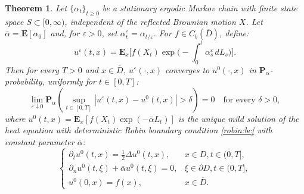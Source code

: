 \documentclass[11pt]{amsart}
\theoremstyle{plain}
\newtheorem{theorem}{Theorem}[section]
\theoremstyle{definition}
\theoremstyle{remark}
\begin{document}
\begin{theorem}\label{thm:averaging}
	Let $\{\alpha_t\}_{t\geq 0}$ be a stationary ergodic Markov chain with finite state space $S \subset [0, \infty)$, independent of the reflected Brownian motion $X$. Let $\bar\alpha=\mathbf E[\alpha_0]$ and, for $\varepsilon>0$, set $\alpha^\varepsilon_t=\alpha_{t/\varepsilon}$. For $f\in C_b(\overline D)$, define:
	\[
	u^\varepsilon(t,x)=\mathbf E_x\Big[f(X_t)\exp\Big(-\int_0^t\alpha^\varepsilon_s\,dL_s\Big)\Big].
	\]
	Then for every $T>0$ and $x\in\overline D$, $u^\varepsilon(\cdot,x)$ converges to $u^0(\cdot,x)$ in $\mathbf{P}_\alpha$-probability, uniformly for $t \in [0,T]$:
	\[
	\lim_{\varepsilon\downarrow 0} \mathbf{P}_\alpha \left( \sup_{t \in [0,T]} |u^\varepsilon(t,x) - u^0(t,x)| > \delta \right) = 0 \quad \text{for every } \delta > 0,
	\]
	where $u^0(t,x)=\mathbf{E}_x[f(X_t) \exp(-\bar \alpha L_t)]$ is the unique mild solution of the heat equation with deterministic Robin boundary condition \eqref{robin:bc} with constant parameter $\bar\alpha$:
	\begin{equation}\label{P_alphabar}
		\begin{cases}
			\partial_t u^0(t,x) = \tfrac{1}{2}\Delta u^0(t,x), & x \in D, t \in (0,T], \\
			\partial_n u^0(t,\xi) + \bar \alpha u^0(t,\xi) = 0, & \xi \in \partial D, t \in (0,T], \\
			u^0(0,x) = f(x), & x \in \overline{D}.
		\end{cases}
	\end{equation}
	
\end{theorem}
\end{document}
